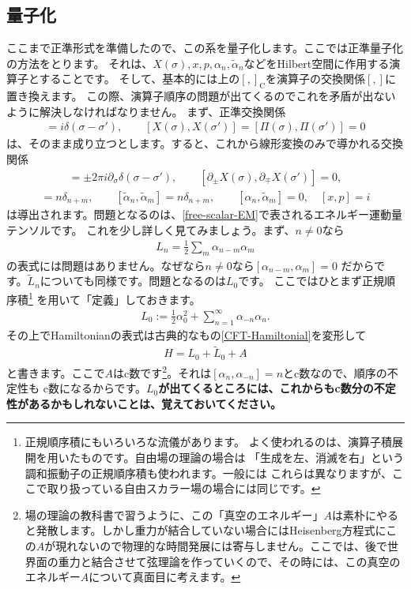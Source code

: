 \documentclass[report,paper=a4, fontsize=12pt, line_length=16cm, number_of_lines=33,dvipdfmx]{jlreq}
\numberwithin{equation}{chapter}
\numberwithin{equation}{section}
\newcommand{\del}{\partial}
\newcommand{\kyou}[1]{{\sffamily \bfseries #1}}
\newcommand{\alphat}{\tilde{\alpha}}
\newcommand{\Lt}{\widetilde{L}}
\newcommand{\cbk}[1]{[#1]_{\mathrm{C}}}
\begin{document}
\subsection{量子化}
ここまで正準形式を準備したので、この系を量子化します。ここでは正準量子化の方法をとります。
それは、$X(\sigma),x,p,\alpha_n,\alphat_n$などをHilbert空間に作用する演算子とすることです。
そして、基本的には上の$\cbk{,}$を演算子の交換関係$[,]$に置き換えます。
この際、演算子順序の問題が出てくるのでこれを矛盾が出ないように解決しなければなりません。
まず、正準交換関係
\begin{align}
[X(\sigma),\Pi(\sigma')]=i\delta(\sigma-\sigma'),\qquad
[X(\sigma),X(\sigma')]=
[\Pi(\sigma),\Pi(\sigma')]=0
\end{align}
は、そのまま成り立つとします。すると、これから線形変換のみで導かれる交換関係
\begin{align}
[\del_{\pm}X(\sigma),\del_{\pm}X(\sigma')]
=\pm 2\pi i \del_{\sigma}\delta(\sigma-\sigma'),\qquad
[\del_{\pm}X(\sigma),\del_{\mp}X(\sigma')]=0,
\end{align}
\begin{align}
[\alpha_{n},\alpha_{m}]=n\delta_{n+m},\qquad
[\alphat_{n},\alphat_{m}]=n\delta_{n+m},\qquad
[\alpha_{n},\alphat_{m}]=0,\quad
[x,p]=i
\end{align}
は導出されます。問題となるのは、\eqref{free-scalar-EM}で表されるエネルギー運動量テンソルです。
これを少し詳しく見てみましょう。まず、$n\ne 0$なら
\begin{align}
L_n=\frac12 \sum_m \alpha_{n-m}\alpha_{m}
\end{align}
の表式には問題はありません。なぜなら$n\ne 0$なら$[\alpha_{n-m},\alpha_{m}]=0$
だからです。$\Lt_n$についても同様です。問題となるのは$L_0$です。
ここではひとまず正規順序積\footnote{正規順序積にもいろいろな流儀があります。
よく使われるのは、演算子積展開を用いたものです。自由場の理論の場合は
「生成を左、消滅を右」という調和振動子の正規順序積も使われます。一般には
これらは異なりますが、ここで取り扱っている自由スカラー場の場合には同じです。}
を用いて「定義」しておきます。
\begin{align}
L_0:=\frac12 \alpha_0^2+\sum_{n=1}^{\infty}\alpha_{-n}\alpha_{n}.
\end{align}
その上でHamiltonianの表式は古典的なもの\eqref{CFT-Hamiltonial}を変形して
\begin{align}
H=L_0+\Lt_0+A
\end{align}
と書きます。ここで$A$はc数です\footnote{場の理論の教科書で習うように、この「真空のエネルギー」$A$は素朴にやると発散します。しかし重力が結合していない場合にはHeisenberg方程式にこの$A$が現れないので物理的な時間発展には寄与しません。ここでは、後で世界面の重力と結合させて弦理論を作っていくので、その時には、この真空のエネルギー$A$について真面目に考えます。}。それは$[\alpha_n,\alpha_{-n}]=n$とc数なので、順序の不定性も
c数になるからです。\kyou{$L_0$が出てくるところには、これからもc数分の不定性があるかもしれないことは、覚えておいてください。}
\end{document}
